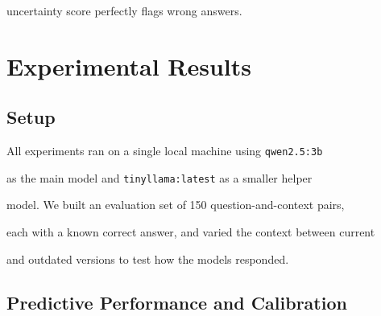 \documentclass[10pt,twoside]{article}
\numberwithin{equation}{section}
\begin{document}
uncertainty score perfectly flags wrong answers.




\section{Experimental Results}




\subsection{Setup}



All experiments ran on a single local machine using \texttt{qwen2.5:3b}

as the main model and \texttt{tinyllama:latest} as a smaller helper

model. We built an evaluation set of 150 question-and-context pairs,

each with a known correct answer, and varied the context between current

and outdated versions to test how the models responded.

\vspace{-20pt} 

\subsection{Predictive Performance and Calibration}
\end{document}

